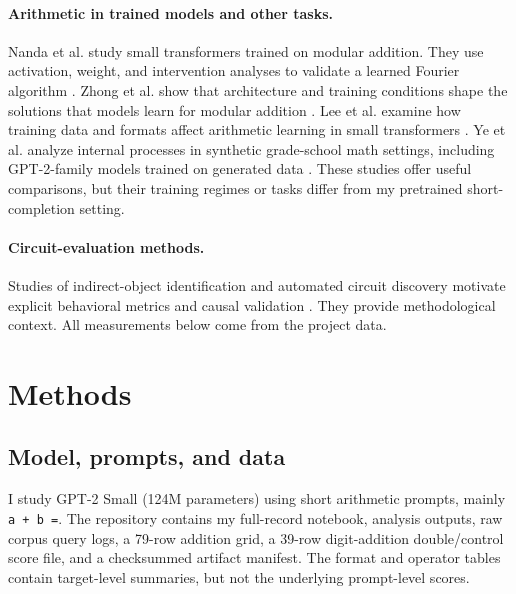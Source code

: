 \documentclass[11pt]{article}
\begin{document}
\paragraph{Arithmetic in trained models and other tasks.} Nanda et al. study small transformers trained on modular addition. They use activation, weight, and intervention analyses to validate a learned Fourier algorithm \cite{nanda2023progress}. Zhong et al. show that architecture and training conditions shape the solutions that models learn for modular addition \cite{zhong2023clock}. Lee et al. examine how training data and formats affect arithmetic learning in small transformers \cite{lee2024teaching}. Ye et al. analyze internal processes in synthetic grade-school math settings, including GPT-2-family models trained on generated data \cite{ye2024physics}. These studies offer useful comparisons, but their training regimes or tasks differ from my pretrained short-completion setting.

\paragraph{Circuit-evaluation methods.} Studies of indirect-object identification and automated circuit discovery motivate explicit behavioral metrics and causal validation \cite{wang2023ioi,conmy2023acdc}. They provide methodological context. All measurements below come from the project data.

\section{Methods}

\subsection{Model, prompts, and data}

I study GPT-2 Small (124M parameters) using short arithmetic prompts, mainly \texttt{a + b =}. The repository contains my full-record notebook, analysis outputs, raw corpus query logs, a 79-row addition grid, a 39-row digit-addition double/control score file, and a checksummed artifact manifest. The format and operator tables contain target-level summaries, but not the underlying prompt-level scores.
\end{document}
